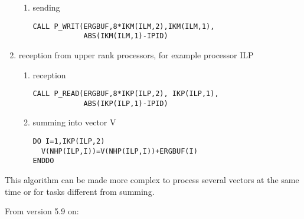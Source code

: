\begin{enumerate}
\begin{enumerate}
    \item sending

    \begin{lstlisting}[language=TelFortran]
CALL P_WRIT(ERGBUF,8*IKM(ILM,2),IKM(ILM,1),
            ABS(IKM(ILM,1)-IPID)
    \end{lstlisting}

  \end{enumerate}
  \item reception from upper rank processors, for example processor ILP
  \begin{enumerate}
    \item reception

    \begin{lstlisting}[language=TelFortran]
CALL P_READ(ERGBUF,8*IKP(ILP,2), IKP(ILP,1),
            ABS(IKP(ILP,1)-IPID)
    \end{lstlisting}

    \item summing into vector V

    \begin{lstlisting}[language=TelFortran]
DO I=1,IKP(ILP,2)
  V(NHP(ILP,I))=V(NHP(ILP,I))+ERGBUF(I)
ENDDO
    \end{lstlisting}
  \end{enumerate}
\end{enumerate}

This algorithm can be made more complex to process several vectors at the same
time or for tasks different from summing.

From version 5.9 on:

